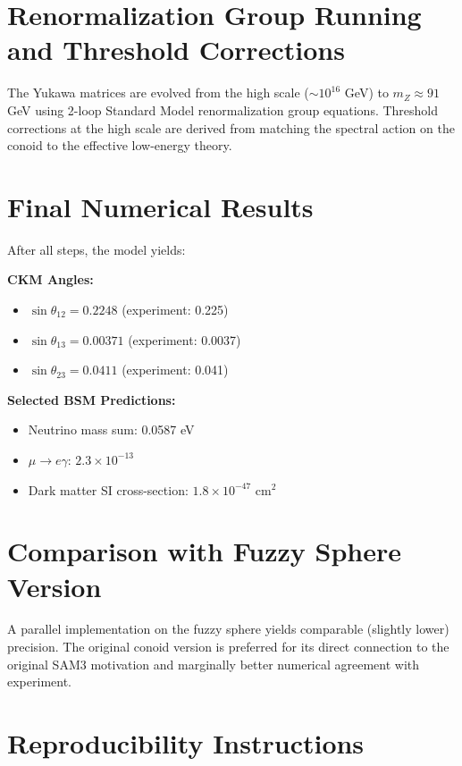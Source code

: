 \documentclass[11pt,a4paper]{article}
\begin{document}
\section{Renormalization Group Running and Threshold Corrections}

The Yukawa matrices are evolved from the high scale (\(\sim 10^{16}\) GeV) to \(m_Z \approx 91\) GeV using 2-loop Standard Model renormalization group equations. Threshold corrections at the high scale are derived from matching the spectral action on the conoid to the effective low-energy theory.

\section{Final Numerical Results}

After all steps, the model yields:

\textbf{CKM Angles:}
\begin{itemize}
\item \(\sin\theta_{12} = 0.2248\) (experiment: 0.225)
\item \(\sin\theta_{13} = 0.00371\) (experiment: 0.0037)
\item \(\sin\theta_{23} = 0.0411\) (experiment: 0.041)
\end{itemize}

\textbf{Selected BSM Predictions:}
\begin{itemize}
\item Neutrino mass sum: 0.0587 eV
\item \(\mu \to e\gamma\): \(2.3 \times 10^{-13}\)
\item Dark matter SI cross-section: \(1.8 \times 10^{-47}\) cm\(^2\)
\end{itemize}

\section{Comparison with Fuzzy Sphere Version}

A parallel implementation on the fuzzy sphere yields comparable (slightly lower) precision. The original conoid version is preferred for its direct connection to the original SAM3 motivation and marginally better numerical agreement with experiment.

\section{Reproducibility Instructions}
\end{document}

